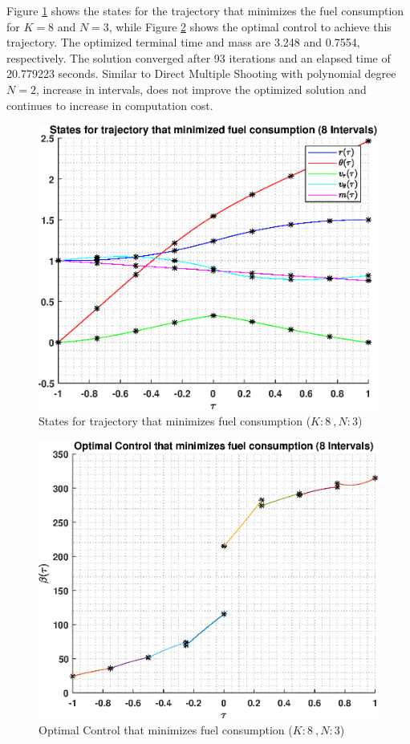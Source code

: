 \documentclass[]{article}
\begin{document}
Figure \ref{fig:directStatesK8Poly3} shows the states for the trajectory that minimizes the fuel consumption for \(K = 8\) and  \(N = 3\), while Figure \ref{fig:directControlK8Poly3} shows the optimal control to achieve this trajectory. The optimized terminal time and mass are 3.248 and 0.7554, respectively. The solution converged after 93 iterations and an elapsed time of 20.779223 seconds. Similar to Direct Multiple Shooting with polynomial degree \(N = 2\), increase in intervals, does not improve the optimized solution and continues to increase in computation cost.
\begin{figure}
	\centering
	\includegraphics[scale=0.75]{directStatesK8Poly3.eps}
	\caption{States for trajectory that minimizes fuel consumption (\(K:8\ , N:3\))}
	\label{fig:directStatesK8Poly3}
\end{figure}
\begin{figure}
	\centering
	\includegraphics[scale=0.75]{directControlK8Poly3.eps}
	\caption{Optimal Control that minimizes fuel consumption (\(K:8\ , N:3\))}
	\label{fig:directControlK8Poly3}
\end{figure}
\FloatBarrier
\end{document}
